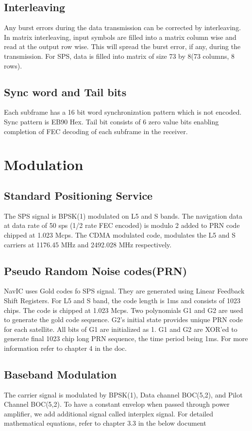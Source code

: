 \documentclass[10pt]{book}
\begin{document}
\subsection{Interleaving}
Any burst errors during the data transmission can be corrected by interleaving. In matrix interleaving, input symbols are filled into a matrix column wise and read at the output row wise. This will spread the burst error, if any, during the transmission. For SPS, data is filled into matrix of size 73 by 8(73 columns, 8 rows).
\subsection{Sync word and Tail bits}
Each subframe has a 16 bit word synchronization pattern which is not encoded. Sync pattern is EB90 Hex. Tail bit consists of 6 zero value bits enabling completion of FEC decoding of each subframe in the receiver.

\section{Modulation}
\subsection{Standard Positioning Service}
The SPS signal is BPSK(1) modulated on L5 and S bands. The navigation data at data rate of 50 sps (1/2 rate FEC encoded) is modulo 2 added to PRN code chipped at 1.023 Mcps. The CDMA modulated code, modulates the L5 and S carriers at 1176.45 MHz and 2492.028 MHz respectively.
\subsection{Pseudo Random Noise codes(PRN)}
NavIC uses Gold codes fo SPS signal. They are generated using Linear Feedback Shift Registers. For L5 and S band, the code length is 1ms and consists of 1023 chips. The code is chipped at 1.023 Mcps. Two polynomials G1 and G2 are used to generate the gold code sequence. G2's initial state provides unique PRN code for each satellite. All bits of G1 are initialized as 1. G1 and G2 are XOR'ed to generate final 1023 chip long PRN sequence, the time period being 1ms. For more information refer to chapter 4 in the doc.
\subsection{Baseband Modulation}
The carrier signal is modulated by BPSK(1), Data channel BOC(5,2), and Pilot Channel BOC(5,2). To have a constant envelop when passed through power amplifier, we add additional signal called interplex signal.
For detailed mathematical equations, refer to chapter 3.3 in the below document
\end{document}
